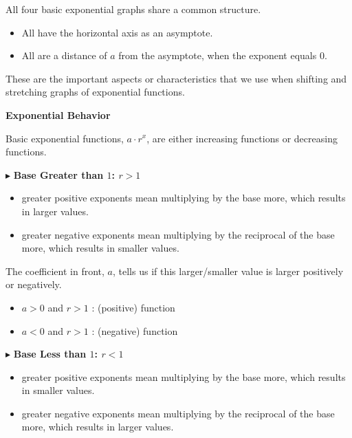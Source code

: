 \documentclass{ximera}
\begin{document}
All four basic exponential graphs share a common structure.


\begin{itemize}
\item All have the horizontal axis as an asymptote.
\item All are a distance of $a$ from the asymptote, when the exponent equals $0$.
\end{itemize}

These are the important aspects or characteristics that we use when shifting and stretching graphs of exponential functions.












\begin{observation} \textbf{\textcolor{blue!75!black}{Exponential Behavior}}


Basic exponential functions, $a \cdot r^x$, are either increasing functions or decreasing functions.


$\blacktriangleright$  \textbf{\textcolor{purple!85!blue}{Base Greater than $1$: $r > 1$}} 


\begin{itemize}
\item greater positive exponents mean multiplying by the base more, which results in larger values.  
\item greater negative exponents mean multiplying by the reciprocal of the base more, which results in smaller values.  
\end{itemize}


The coefficient in front, $a$, tells us if this larger/smaller value is larger positively or negatively.


\begin{itemize}
\item $a > 0$ and $r > 1$ :   (positive) function
\item $a < 0$ and $r > 1$ :   (negative) function  
\end{itemize}






$\blacktriangleright$  \textbf{\textcolor{purple!85!blue}{Base Less than $1$: $r < 1$}}  


\begin{itemize} 
\item greater positive exponents mean multiplying by the base more, which results in smaller values.  
\item greater negative exponents mean multiplying by the reciprocal of the base more, which results in larger values.  
\end{itemize}



\end{observation}
\end{document}
